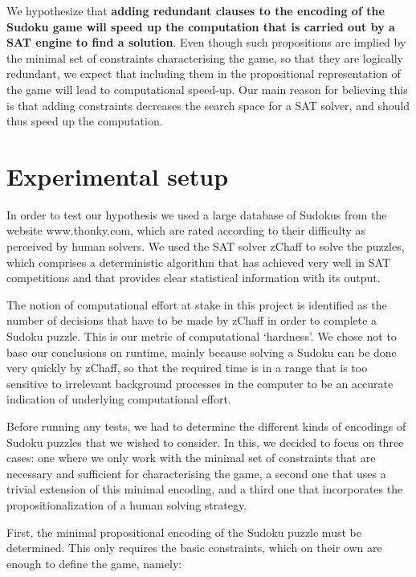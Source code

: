 \documentclass[10pt,a4paper,leqno]{article}
\begin{document}
We hypothesize that \textbf{adding redundant clauses to the encoding of the Sudoku game will speed up the computation that is carried out by a SAT engine to find a solution}. Even though such propositions are implied by the minimal set of constraints characterising the game, so that they are logically redundant, we expect that including them in the propositional representation of the game will lead to computational speed-up. Our main reason for believing this is that adding constraints decreases the search space for a SAT solver, and should thus speed up the computation. 

\section*{Experimental setup}

 
In order to test our hypothesis we used a large database of Sudokus from the website www.thonky.com, which are rated according to their difficulty as perceived by human solvers. We used the SAT solver zChaff to solve the puzzles, which comprises a deterministic algorithm that has achieved very well in SAT competitions and that provides clear statistical information with its output. 

The notion of computational effort at stake in this project is identified as the number of decisions that have to be made by zChaff in order to complete a Sudoku puzzle. This is our metric of computational `hardness'. We chose not to base our conclusions on runtime, mainly because solving a Sudoku can be done very quickly by zChaff, so that the required time is in a range that is too sensitive to irrelevant background processes in the computer to be an accurate indication of underlying computational effort. 

Before running any tests, we had to determine the different kinds of encodings of Sudoku puzzles that we wished to consider. In this, we decided to focus on three cases: one where we only work with the minimal set of constraints that are necessary and sufficient for characterising the game, a second one that uses a trivial extension of this minimal encoding, and a third one that incorporates the propositionalization of a human solving strategy. 

First, the minimal propositional encoding of the Sudoku puzzle must be determined. This only requires the basic constraints, which on their own are enough to define the game, namely:
\end{document}
